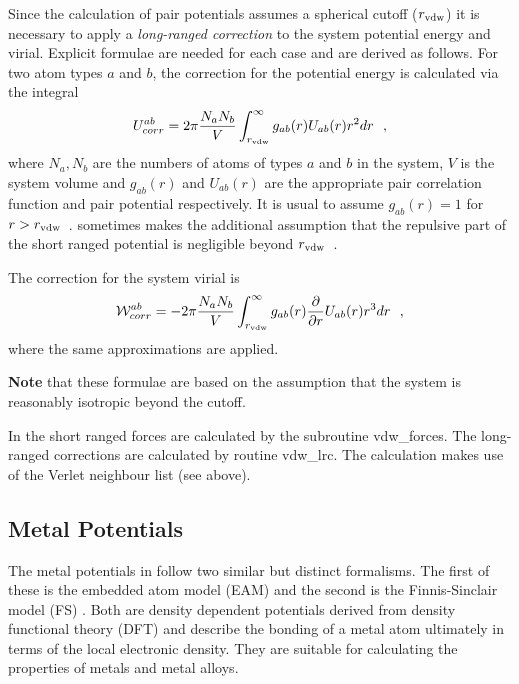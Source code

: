 Since the calculation of pair potentials assumes a spherical
cutoff ($r_{\rm vdw}$) it is necessary to apply a {\em long-ranged
correction} to the
system potential energy and virial.  Explicit formulae are needed
for each case and are derived as follows.  For two atom types $a$
and $b$, the correction for the potential energy is calculated via
the integral
\begin{equation}
U_{corr}^{ab} = 2\pi
\frac{N_{a}N_{b}}{V}\int_{r_{\rm vdw}}^{\infty}g_{ab}(r)U_{ab}(r)r^{2}dr~~,
\end{equation}
where $N_{a},N_{b}$ are the numbers of atoms of types $a$ and $b$
in the system, $V$ is the system volume and $g_{ab}(r)$ and
$U_{ab}(r)$ are the appropriate pair correlation function and pair
potential respectively.  It is usual to assume $g_{ab}(r)=1$ for
$r>r_{\rm vdw}$~.  \D sometimes makes the additional assumption that
the repulsive part of the short ranged potential is negligible
beyond $r_{\rm vdw}$~.

The correction for the system virial is
\begin{equation}
{\cal W}_{corr}^{ab} = -2\pi \frac{N_{a}N_{b}}{V}
\int_{r_{\rm vdw}}^{\infty}g_{ab}(r) \frac{\partial}{\partial
r}U_{ab}(r)r^{3}dr~~,
\end{equation}
where the same approximations are applied.

{\bf Note} that these formulae are based on the assumption that the
system is reasonably isotropic beyond the cutoff.

In \D the short ranged forces are calculated by the subroutine
{\sc vdw\_forces}.  The long-ranged corrections are calculated by
routine {\sc vdw\_lrc}.  The calculation makes use of the
Verlet neighbour list (see above).

\subsection{Metal Potentials}
\label{metal}

The metal potentials in \D follow two similar but distinct formalisms.
The first of these is the embedded atom model (EAM)
\cite{baskes-84a,baskes-86a} and the second is the Finnis-Sinclair
model (FS) \cite{finnis-84a}. Both are density dependent potentials
derived from density functional theory (DFT) and describe the bonding
of a metal atom ultimately in terms of the local electronic density.
They are suitable for calculating the properties of metals
 and metal alloys.

